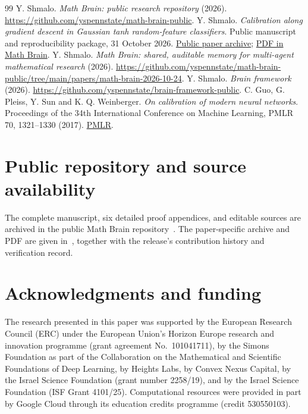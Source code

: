 \documentclass[
  11pt,
  a4paper,
]{article}
\begin{document}
\begin{thebibliography}{99}
  Y. Shmalo. \emph{Math Brain: public research repository} (2026).
  \url{https://github.com/yspennstate/math-brain-public}.
  Y. Shmalo. \emph{Calibration along gradient descent in Gaussian tanh
  random-feature classifiers}. Public manuscript and reproducibility
  package, 31 October 2026.
  \href{https://github.com/yspennstate/math-brain-public/tree/main/papers/three-targets-2026-10-31/T357}{Public paper archive};
  \href{https://github.com/yspennstate/math-brain-public/blob/main/papers/three-targets-2026-10-31/T357/T357_Calibration_Along_Gradient_Descent.pdf}{PDF in Math Brain}.
  Y. Shmalo. \emph{Math Brain: shared, auditable memory for multi-agent mathematical research} (2026).
  \url{https://github.com/yspennstate/math-brain-public/tree/main/papers/math-brain-2026-10-24}.
  Y. Shmalo. \emph{Brain framework} (2026).
  \url{https://github.com/yspennstate/brain-framework-public}.
  C. Guo, G. Pleiss, Y. Sun and K. Q. Weinberger. \emph{On calibration of modern
  neural networks}. Proceedings of the 34th International Conference on Machine Learning,
  PMLR 70, 1321--1330 (2017).
  \href{https://proceedings.mlr.press/v70/guo17a.html}{PMLR}.
\end{thebibliography}

\section*{Public repository and source availability}
The complete manuscript, six detailed proof appendices, and editable
sources are archived in the public Math Brain repository~\cite{MathBrainRepo}. The
paper-specific archive and PDF are given in~\cite{T357Archive}, together with the
release's contribution history and verification record.

\section*{Acknowledgments and funding}\label{acknowledgments-funding-and-declarations}

The research presented in this
paper was supported by the European Research Council (ERC) under the
European Union's Horizon Europe research and innovation programme (grant
agreement No.~101041711), by the Simons Foundation as part of the
Collaboration on the Mathematical and Scientific Foundations of Deep
Learning, by Heights Labs, by Convex Nexus Capital, by the Israel
Science Foundation (grant number 2258/19), and by the Israel Science
Foundation (ISF Grant 4101/25). Computational resources were provided in part by Google Cloud through its education credits programme (credit 530550103).
\end{document}
